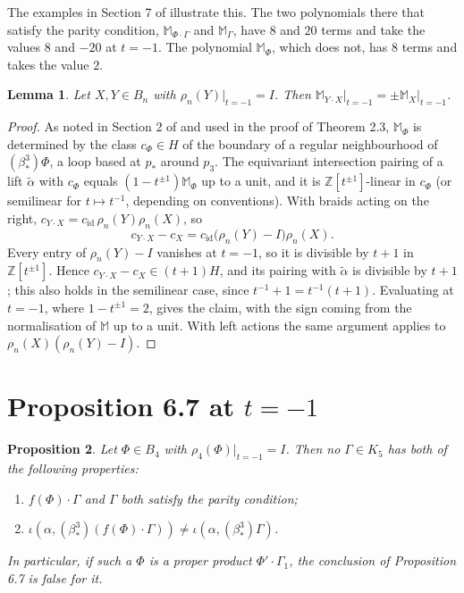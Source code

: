 \documentclass[11pt]{amsart}
\newtheorem{lemma}{Lemma}
\newtheorem{proposition}[lemma]{Proposition}
\theoremstyle{remark}
\newcommand{\M}{\mathbb{M}}
\newcommand{\bs}{\beta^3_*}
\newcommand{\at}{\big|_{t=-1}}
\begin{document}
The examples in Section 7 of \cite{BBB} illustrate this. The two polynomials there that satisfy the parity condition, $\M_{\Phi\cdot\Gamma}$ and $\M_\Gamma$, have $8$ and $20$ terms and take the values $8$ and $-20$ at $t=-1$. The polynomial $\M_\Phi$, which does not, has $8$ terms and takes the value $2$.

\begin{lemma}\label{lem:tminus1}
Let $X,Y\in B_n$ with $\rho_n(Y)\at=I$. Then $\M_{Y\cdot X}\at=\pm\M_X\at$.
\end{lemma}

\begin{proof}
As noted in Section 2 of \cite{BBB} and used in the proof of Theorem 2.3, $\M_\Phi$ is determined by the class $c_\Phi\in H$ of the boundary of a regular neighbourhood of $(\bs)\Phi$, a loop based at $p_*$ around $p_3$. The equivariant intersection pairing of a lift $\tilde\alpha$ with $c_\Phi$ equals $(1-t^{\pm1})\M_\Phi$ up to a unit, and it is $\mathbb{Z}[t^{\pm1}]$-linear in $c_\Phi$ (or semilinear for $t\mapsto t^{-1}$, depending on conventions). With braids acting on the right, $c_{Y\cdot X}=c_{\mathrm{id}}\,\rho_n(Y)\rho_n(X)$, so
\[
c_{Y\cdot X}-c_X=c_{\mathrm{id}}\bigl(\rho_n(Y)-I\bigr)\rho_n(X).
\]
Every entry of $\rho_n(Y)-I$ vanishes at $t=-1$, so it is divisible by $t+1$ in $\mathbb{Z}[t^{\pm1}]$. Hence $c_{Y\cdot X}-c_X\in(t+1)H$, and its pairing with $\tilde\alpha$ is divisible by $t+1$; this also holds in the semilinear case, since $t^{-1}+1=t^{-1}(t+1)$. Evaluating at $t=-1$, where $1-t^{\pm1}=2$, gives the claim, with the sign coming from the normalisation of $\M$ up to a unit. With left actions the same argument applies to $\rho_n(X)(\rho_n(Y)-I)$.
\end{proof}

\section{\texorpdfstring{Proposition 6.7 at $t=-1$}{Proposition 6.7 at t = -1}}

\begin{proposition}\label{prop:main}
Let $\Phi\in B_4$ with $\rho_4(\Phi)\at=I$. Then no $\Gamma\in K_5$ has both of the following properties:
\begin{enumerate}
\item[(i)] $f(\Phi)\cdot\Gamma$ and $\Gamma$ both satisfy the parity condition;
\item[(ii)] $\iota(\alpha,(\bs)(f(\Phi)\cdot\Gamma))\neq\iota(\alpha,(\bs)\Gamma)$.
\end{enumerate}
In particular, if such a $\Phi$ is a proper product $\Phi'\cdot\Gamma_1$, the conclusion of Proposition 6.7 is false for it.
\end{proposition}
\end{document}
